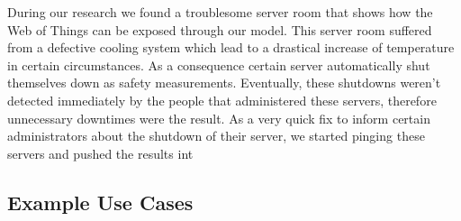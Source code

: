 





During our research we found a troublesome server room that shows how the \textrm{Web of Things} can be exposed through our model.
This server room suffered from a defective cooling system which lead to a drastical increase of temperature in certain circumstances.
As a consequence certain server automatically shut themselves down as safety measurements.
Eventually, these shutdowns weren't detected immediately by the people that administered these servers, therefore unnecessary downtimes were the result.
As a very quick fix to inform certain administrators about the shutdown of their server, we started pinging these servers and pushed the results int


\subsection{Example Use Cases}

